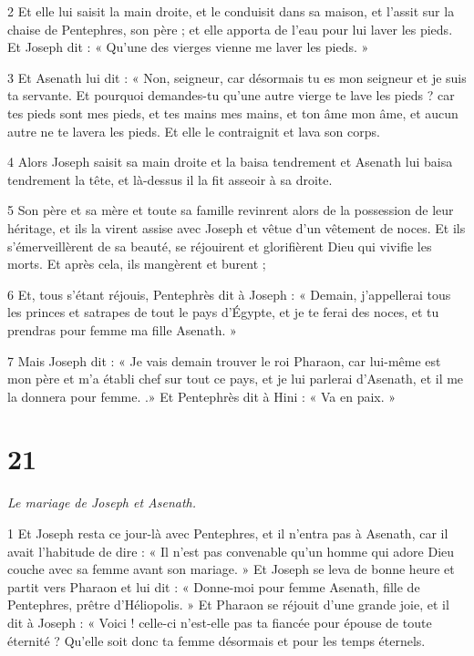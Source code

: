 \par 2 Et elle lui saisit la main droite, et le conduisit dans sa maison, et l'assit sur la chaise de Pentephres, son père ; et elle apporta de l'eau pour lui laver les pieds. Et Joseph dit : « Qu’une des vierges vienne me laver les pieds. »

\par 3 Et Asenath lui dit : « Non, seigneur, car désormais tu es mon seigneur et je suis ta servante. Et pourquoi demandes-tu qu’une autre vierge te lave les pieds ? car tes pieds sont mes pieds, et tes mains mes mains, et ton âme mon âme, et aucun autre ne te lavera les pieds. Et elle le contraignit et lava son corps.

\par 4 Alors Joseph saisit sa main droite et la baisa tendrement et Asenath lui baisa tendrement la tête, et là-dessus il la fit asseoir à sa droite.

\par 5 Son père et sa mère et toute sa famille revinrent alors de la possession de leur héritage, et ils la virent assise avec Joseph et vêtue d'un vêtement de noces. Et ils s'émerveillèrent de sa beauté, se réjouirent et glorifièrent Dieu qui vivifie les morts. Et après cela, ils mangèrent et burent ;

\par 6 Et, tous s'étant réjouis, Pentephrès dit à Joseph : « Demain, j'appellerai tous les princes et satrapes de tout le pays d'Égypte, et je te ferai des noces, et tu prendras pour femme ma fille Asenath. »

\par 7 Mais Joseph dit : « Je vais demain trouver le roi Pharaon, car lui-même est mon père et m'a établi chef sur tout ce pays, et je lui parlerai d'Asenath, et il me la donnera pour femme. .» Et Pentephrès dit à Hini : « Va en paix. »

\chapter{21}

\par \textit{Le mariage de Joseph et Asenath.}

\par 1 Et Joseph resta ce jour-là avec Pentephres, et il n'entra pas à Asenath, car il avait l'habitude de dire : « Il n'est pas convenable qu'un homme qui adore Dieu couche avec sa femme avant son mariage. » Et Joseph se leva de bonne heure et partit vers Pharaon et lui dit : « Donne-moi pour femme Asenath, fille de Pentephres, prêtre d'Héliopolis. » Et Pharaon se réjouit d'une grande joie, et il dit à Joseph : « Voici ! celle-ci n'est-elle pas ta fiancée pour épouse de toute éternité ? Qu'elle soit donc ta femme désormais et pour les temps éternels.

